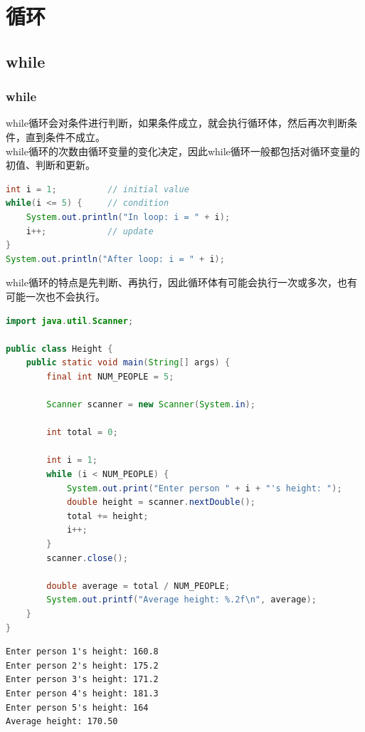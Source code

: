 \chapter{循环}

\section{while}

\subsection{while}

while循环会对条件进行判断，如果条件成立，就会执行循环体，然后再次判断条件，直到条件不成立。\\

while循环的次数由循环变量的变化决定，因此while循环一般都包括对循环变量的初值、判断和更新。

\vspace{-0.5cm}

\begin{lstlisting}[language=Java]
int i = 1;          // initial value
while(i <= 5) {     // condition
    System.out.println("In loop: i = " + i);
    i++;            // update
}
System.out.println("After loop: i = " + i);
\end{lstlisting}

while循环的特点是先判断、再执行，因此循环体有可能会执行一次或多次，也有可能一次也不会执行。\\


\begin{lstlisting}[language=Java]
import java.util.Scanner;

public class Height {
    public static void main(String[] args) {
        final int NUM_PEOPLE = 5;

        Scanner scanner = new Scanner(System.in);

        int total = 0;

        int i = 1;
        while (i < NUM_PEOPLE) {
            System.out.print("Enter person " + i + "'s height: ");
            double height = scanner.nextDouble();
            total += height;
            i++;
        }
        scanner.close();

        double average = total / NUM_PEOPLE;
        System.out.printf("Average height: %.2f\n", average);
    }
}
\end{lstlisting}

\begin{tcolorbox}
    \begin{verbatim}
Enter person 1's height: 160.8
Enter person 2's height: 175.2
Enter person 3's height: 171.2
Enter person 4's height: 181.3
Enter person 5's height: 164
Average height: 170.50
\end{verbatim}
\end{tcolorbox}

